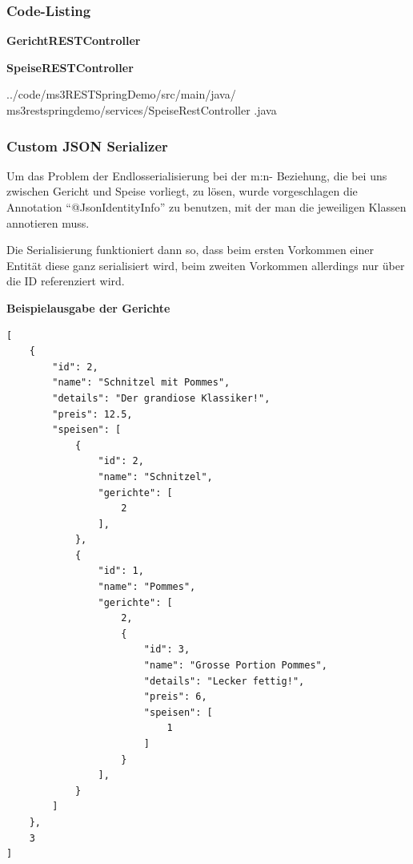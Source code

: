 \subsubsection{Code-Listing}

\begin{mdframed}[style=codebox]
\textbf{GerichtRESTController}

\end{mdframed}

\begin{mdframed}[style=codebox]
\textbf{SpeiseRESTController}

{%
  ../code/ms3RESTSpringDemo/src/main/java/%
  ms3restspringdemo/services/SpeiseRestController%
  .java
}
\end{mdframed}


\subsubsection{Custom JSON Serializer}


Um das Problem der Endlosserialisierung bei der m:n-
Beziehung, die bei uns zwischen Gericht und Speise
vorliegt, zu l\"osen, wurde vorgeschlagen die Annotation
"`@JsonIdentityInfo"' zu benutzen, mit der man die
jeweiligen Klassen annotieren muss.

Die Serialisierung funktioniert dann so, dass beim ersten
Vorkommen einer Entit\"at diese ganz serialisiert wird,
beim zweiten Vorkommen allerdings nur über die ID
referenziert wird.

\begin{mdframed}[style=codebox]
\textbf{Beispielausgabe der Gerichte}
\begin{lstlisting}
[
    {
        "id": 2,
        "name": "Schnitzel mit Pommes",
        "details": "Der grandiose Klassiker!",
        "preis": 12.5,
        "speisen": [
            {
                "id": 2,
                "name": "Schnitzel",
                "gerichte": [
                    2
                ],
            },
            {
                "id": 1,
                "name": "Pommes",
                "gerichte": [
                    2,
                    {
                        "id": 3,
                        "name": "Grosse Portion Pommes",
                        "details": "Lecker fettig!",
                        "preis": 6,
                        "speisen": [
                            1
                        ]
                    }
                ],
            }
        ]
    },
    3
]
\end{lstlisting}
\end{mdframed}

